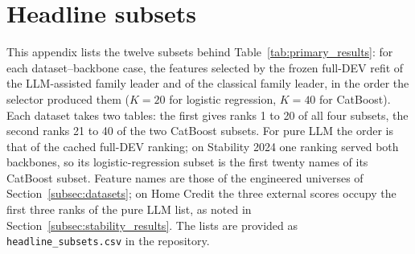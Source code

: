 \documentclass[final,5p,twocolumn]{elsarticle}
\newcommand{\Kfeat}{K}
\begin{document}
\section{Headline subsets}
\label{app:subsets}
\setcounter{table}{0}\setcounter{figure}{0}

This appendix lists the twelve subsets behind Table~\ref{tab:primary_results}: for each dataset--backbone case, the features selected by the frozen full-DEV refit of the LLM-assisted family leader and of the classical family leader, in the order the selector produced them ($\Kfeat=20$ for logistic regression, $\Kfeat=40$ for CatBoost). Each dataset takes two tables: the first gives ranks 1 to 20 of all four subsets, the second ranks 21 to 40 of the two CatBoost subsets. For pure LLM the order is that of the cached full-DEV ranking; on Stability 2024 one ranking served both backbones, so its logistic-regression subset is the first twenty names of its CatBoost subset. Feature names are those of the engineered universes of Section~\ref{subsec:datasets}; on Home Credit the three external scores occupy the first three ranks of the pure LLM list, as noted in Section~\ref{subsec:stability_results}. The lists are provided as \texttt{headline\_subsets.csv} in the repository.
\end{document}
